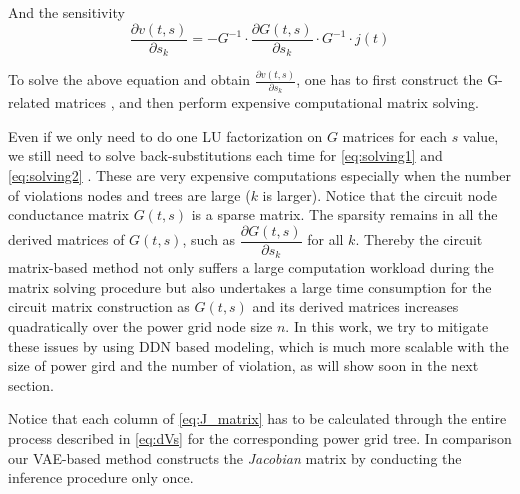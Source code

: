 And the sensitivity 
\begin{equation}
	\label{eq:dVs}
	\dfrac{\partial v(t,s)}{\partial s_{k}} = -G^{-1}\cdot \dfrac{\partial G(t,s)}{\partial s_{k}}  \cdot G^{-1}\cdot j(t)
\end{equation}




To solve the above equation and obtain $ \frac{\partial v(t,s)}{\partial s_{k}}$, one has to first construct the G-related matrices , and then perform expensive computational matrix solving. 


Even if we only need to do one LU factorization on $G$ matrices for each $s$ value, we still need to solve back-substitutions each time for \eqref{eq:solving1} and \eqref{eq:solving2} . These are very expensive computations especially when the number of violations nodes and trees are large ($k$ is larger).
Notice that the circuit node conductance matrix $G(t,s)$ is a sparse matrix. The sparsity remains in all the derived matrices of $G(t,s)$, such as $\dfrac{\partial G(t,s)}{\partial s_{k}}$ for all $k$.
Thereby the circuit matrix-based method not only suffers a large computation workload during the matrix solving procedure but also undertakes a large time consumption for the circuit matrix construction as $G(t,s)$ and its derived matrices increases quadratically over the power grid node size $n$. In this work, we try to mitigate these issues by using DDN based modeling, which is much more scalable with the size of power gird and the number of violation, as will show soon in the next section. 


Notice that each column of \eqref{eq:J_matrix} has to be calculated through the entire process described in \eqref{eq:dVs} for the corresponding power grid tree. In comparison our VAE-based method constructs the \textit{Jacobian} matrix by conducting the inference procedure only once.





